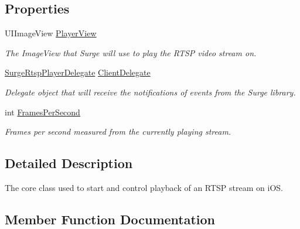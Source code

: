 \subsection*{Properties}
\begin{DoxyCompactItemize}
\item 
U\+I\+Image\+View \hyperlink{interface_surge_xamarini_o_s_bindings_1_1_surge_rtsp_player_ab629f9303d6b427a8213e1dee03a3810}{Player\+View}
\begin{DoxyCompactList}\small\item\em The Image\+View that Surge will use to play the R\+T\+SP video stream on. \end{DoxyCompactList}\item 
\hyperlink{interface_surge_xamarini_o_s_bindings_1_1_surge_rtsp_player_delegate}{Surge\+Rtsp\+Player\+Delegate} \hyperlink{interface_surge_xamarini_o_s_bindings_1_1_surge_rtsp_player_a6c7ed65f9656542894f0ccfe7e728b0e}{Client\+Delegate}
\begin{DoxyCompactList}\small\item\em Delegate object that will receive the notifications of events from the Surge library. \end{DoxyCompactList}\item 
int \hyperlink{interface_surge_xamarini_o_s_bindings_1_1_surge_rtsp_player_a84dbe2b6b5456cbe5e261057e027eb40}{Frames\+Per\+Second}
\begin{DoxyCompactList}\small\item\em Frames per second measured from the currently playing stream. \end{DoxyCompactList}\end{DoxyCompactItemize}


\subsection{Detailed Description}
The core class used to start and control playback of an R\+T\+SP stream on i\+OS. 



\subsection{Member Function Documentation}
\mbox{\label{interface_surge_xamarini_o_s_bindings_1_1_surge_rtsp_player_a7c2572b559c1758415a21c0bde4417be}} 
